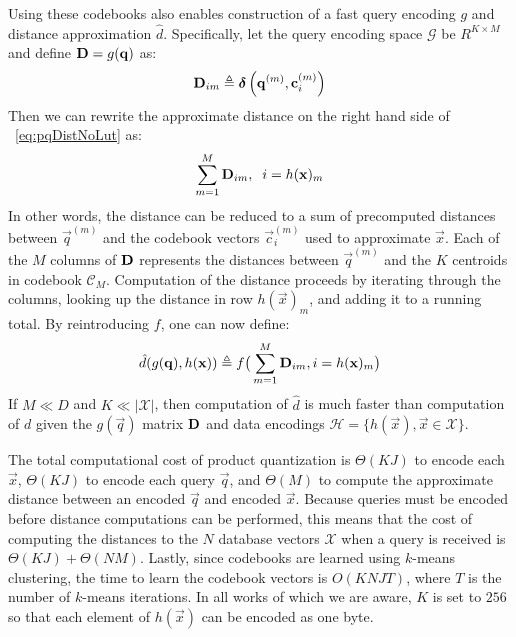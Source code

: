 Using these codebooks also enables construction of a fast query encoding $g$ and distance approximation $\hat{d}$. Specifically, let the query encoding space $\mathcal{G}$ be $R^{K \times M}$ and define $\mathbf{D} = g(\mathbf{q})$ as: %
\begin{align}
    \mathbf{D}_{im} \triangleq \boldsymbol{\delta} \left( \mathbf{q}^{(m)}, \mathbf{c}_i^{(m)} \right)
\end{align}
Then we can rewrite the approximate distance on the right hand side of ~\ref{eq:pqDistNoLut} as:
\begin{align} \label{eq:pqDist}
        \sum_{m=1}^M \mathbf{D}_{im}, \hspace{2mm} i = h(\mathbf{x})_m
\end{align}
In other words, the distance can be reduced to a sum of precomputed distances between $\vec{q}^{(m)}$ and the codebook vectors $\vec{c}_i^{(m)}$ used to approximate $\vec{x}$. Each of the $M$ columns of $\mathbf{D}$ represents the distances between $\vec{q}^{(m)}$ and the $K$ centroids in codebook $\mathcal{C}_M$. Computation of the distance proceeds by iterating through the columns, looking up the distance in row $h(\vec{x})_m$, and adding it to a running total. By reintroducing $f$, one can now define:
\begin{align} \label{eq:pq_dhat}
    \hat{d}(g(\mathbf{q}), h(\mathbf{x})) \triangleq f \big( \sum_{m=1}^M \mathbf{D}_{im}, i = h(\mathbf{x})_m \big)
\end{align}
If $M \ll D$ and $K \ll |\mathcal{X}|$, then computation of $\hat{d}$ is much faster than computation of $d$ given the $g(\vec{q})$ matrix $\mathbf{D}$ and data encodings $\mathcal{H} = \{h(\vec{x}), \vec{x} \in \mathcal{X} \}$.

The total computational cost of product quantization is $\Theta(KJ)$ to encode each $\vec{x}$, $\Theta(KJ)$ to encode each query $\vec{q}$, and $\Theta(M)$ to compute the approximate distance between an encoded $\vec{q}$ and encoded $\vec{x}$. Because queries must be encoded before distance computations can be performed, this means that the cost of computing the distances to the $N$ database vectors $\mathcal{X}$ when a query is received is $\Theta(KJ) + \Theta(NM)$. Lastly, since codebooks are learned using $k$-means clustering, the time to learn the codebook vectors is $O(KNJT)$, where $T$ is the number of $k$-means iterations. In all works of which we are aware, $K$ is set to $256$ so that each element of $h(\vec{x})$ can be encoded as one byte. %

